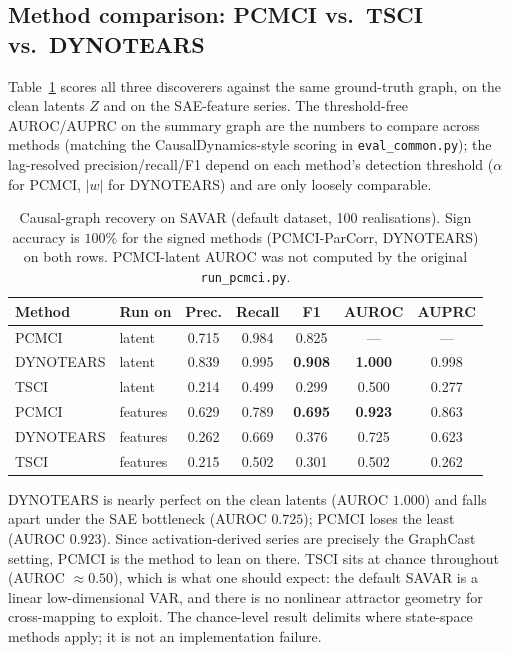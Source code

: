 \subsection{Method comparison: PCMCI vs.\ TSCI vs.\ DYNOTEARS}
\label{sec:methodcompare}

Table~\ref{tab:methods} scores all three discoverers against the same ground-truth
graph, on the clean latents $Z$ and on the SAE-feature series. The threshold-free
AUROC/AUPRC on the summary graph are the numbers to compare across methods
(matching the CausalDynamics-style scoring in \texttt{eval\_common.py}); the
lag-resolved precision/recall/F1 depend on each method's detection threshold
($\alpha$ for PCMCI, $|w|$ for DYNOTEARS) and are only loosely comparable.

\begin{table}[h]
\centering
\small
\begin{tabular}{llccccc}
\toprule
Method & Run on & Prec. & Recall & F1 & AUROC & AUPRC \\
\midrule
PCMCI     & latent   & 0.715 & 0.984 & 0.825 & ---   & ---   \\
DYNOTEARS & latent   & 0.839 & 0.995 & \textbf{0.908} & \textbf{1.000} & 0.998 \\
TSCI      & latent   & 0.214 & 0.499 & 0.299 & 0.500 & 0.277 \\
\midrule
PCMCI     & features & 0.629 & 0.789 & \textbf{0.695} & \textbf{0.923} & 0.863 \\
DYNOTEARS & features & 0.262 & 0.669 & 0.376 & 0.725 & 0.623 \\
TSCI      & features & 0.215 & 0.502 & 0.301 & 0.502 & 0.262 \\
\bottomrule
\end{tabular}
\caption{Causal-graph recovery on SAVAR (default dataset, 100 realisations). Sign
accuracy is $100\%$ for the signed methods (PCMCI-ParCorr, DYNOTEARS) on both rows.
PCMCI-latent AUROC was not computed by the original \texttt{run\_pcmci.py}.}
\label{tab:methods}
\end{table}

DYNOTEARS is nearly perfect on the clean latents (AUROC $1.000$) and falls apart
under the SAE bottleneck (AUROC $0.725$); PCMCI loses the least (AUROC $0.923$).
Since activation-derived series are precisely the GraphCast setting, PCMCI is the
method to lean on there. TSCI sits at chance throughout (AUROC ${\approx}0.50$),
which is what one should expect: the default SAVAR is a linear low-dimensional VAR,
and there is no nonlinear attractor geometry for cross-mapping to exploit. The
chance-level result delimits where state-space methods apply; it is not an
implementation failure.

